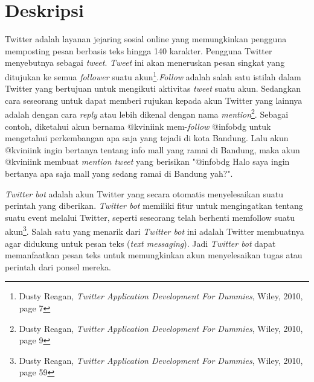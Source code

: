 \documentclass[a4paper,twoside]{article}
\begin{document}
\title{\@judultopik}
\author{\nama \textendash \@npm} 

\newcommand{\nama}{Kevin Theodorus Yonathan}
\newcommand{\@npm}{2011730037}
\newcommand{\@judultopik}{Pembuatan \textit{Twitter Bot} Untuk Mencari Jalur Transportasi Publik} %
\newcommand{\jumpemb}{1} %
\newcommand{\tanggal}{05/16/2014}
\maketitle


\section{Deskripsi}
Twitter adalah layanan jejaring sosial online yang memungkinkan pengguna memposting pesan berbasis teks hingga 140 karakter. Pengguna Twitter menyebutnya sebagai \textit{tweet}. \textit{Tweet} ini akan meneruskan pesan singkat yang ditujukan ke semua \textit{follower} suatu akun\footnote{Dusty Reagan, \textit{Twitter Application Development For Dummies}, Wiley, 2010, page 7}.\textit{Follow} adalah salah satu istilah dalam Twitter yang bertujuan untuk mengikuti aktivitas \textit{tweet} suatu akun. Sedangkan cara seseorang untuk dapat memberi rujukan kepada akun Twitter yang lainnya adalah dengan cara \textit{reply} atau lebih dikenal dengan nama \textit{mention}\footnote{Dusty Reagan, \textit{Twitter Application Development For Dummies}, Wiley, 2010, page 9}. Sebagai contoh, diketahui akun bernama @kviniink mem-\textit{follow} @infobdg untuk mengetahui perkembangan apa saja yang tejadi di kota Bandung. Lalu akun @kviniink ingin bertanya tentang info mall yang ramai di Bandung, maka akun @kviniink membuat \textit{mention tweet} yang berisikan "@infobdg Halo saya ingin bertanya apa saja mall yang sedang ramai di Bandung yah?".

\textit{Twitter bot} adalah akun Twitter yang secara otomatis menyelesaikan suatu perintah yang diberikan. \textit{Twitter bot} memiliki fitur untuk  mengingatkan tentang suatu event melalui Twitter, seperti seseorang telah berhenti memfollow suatu akun\footnote{Dusty Reagan, \textit{Twitter Application Development For Dummies}, Wiley, 2010, page 59}. Salah satu yang menarik dari \textit{Twitter bot} ini adalah Twitter membuatnya agar didukung untuk pesan teks (\textit{text messaging}). Jadi \textit{Twitter bot} dapat memanfaatkan pesan teks untuk memungkinkan akun menyelesaikan tugas atau perintah dari ponsel mereka.
\end{document}
